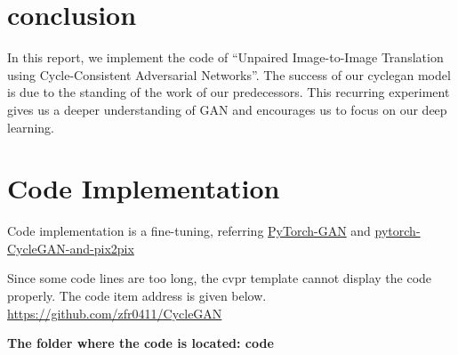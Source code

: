 \documentclass[10pt,twocolumn,letterpaper]{article}
\begin{document}
\section{conclusion }

In this report, we implement the code of 
“Unpaired Image-to-Image Translation 
using Cycle-Consistent Adversarial Networks”. 
The success of our cyclegan model is 
due to the standing of the work of our predecessors.
This recurring experiment gives us a deeper 
understanding of GAN and encourages us to focus on our deep learning.



\section{Code Implementation }

Code implementation is a fine-tuning, referring \href{https://github.com/eriklindernoren/PyTorch-GAN}{PyTorch-GAN}
and 
\href{https://github.com/junyanz/pytorch-CycleGAN-and-pix2pix}{pytorch-CycleGAN-and-pix2pix}






Since some code lines are too long, the cvpr template cannot display the code properly. The code item address is given below.	\url{https://github.com/zfr0411/CycleGAN}

\bf{The folder where the code is located: code}



{\small


}
\end{document}
